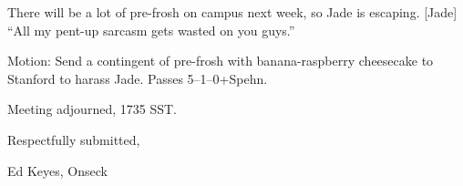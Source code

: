 \documentclass[12pt]{article}
\begin{document}
There will be a lot of pre-frosh on campus next week, so Jade is
escaping.  [Jade] ``All my pent-up sarcasm gets wasted on you guys.''

Motion: Send a contingent of pre-frosh with banana-raspberry cheesecake
to Stanford to harass Jade.  Passes 5--1--0+Spehn.

\vspace{12pt}

\noindent
Meeting adjourned, 1735 SST.

\vspace{18pt}

\centerline{Respectfully submitted,}
\centerline{Ed Keyes, Onseck}
\end{document}
